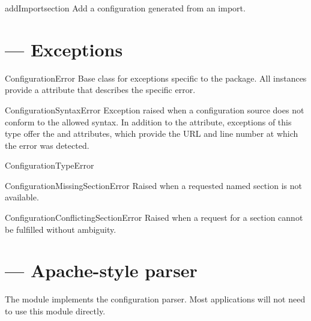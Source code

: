 \documentclass{howto}
\begin{document}
\begin{methoddesc}[ImportingConfiguration]{addImport}{section}
  Add a configuration generated from an import.
\end{methoddesc}


\section{ --- Exceptions}


\begin{excdesc}{ConfigurationError}
  Base class for exceptions specific to the  package.
  All instances provide a  attribute that describes
  the specific error.
\end{excdesc}

\begin{excdesc}{ConfigurationSyntaxError}
  Exception raised when a configuration source does not conform to the
  allowed syntax.  In addition to the  attribute,
  exceptions of this type offer the  and 
  attributes, which provide the URL and line number at which the error
  was detected.
\end{excdesc}

\begin{excdesc}{ConfigurationTypeError}
\end{excdesc}

\begin{excdesc}{ConfigurationMissingSectionError}
  Raised when a requested named section is not available.
\end{excdesc}

\begin{excdesc}{ConfigurationConflictingSectionError}
  Raised when a request for a section cannot be fulfilled without
  ambiguity.
\end{excdesc}


\section{ --- Apache-style parser}


The  module implements the configuration
parser.  Most applications will not need to use this module directly.
\end{document}
